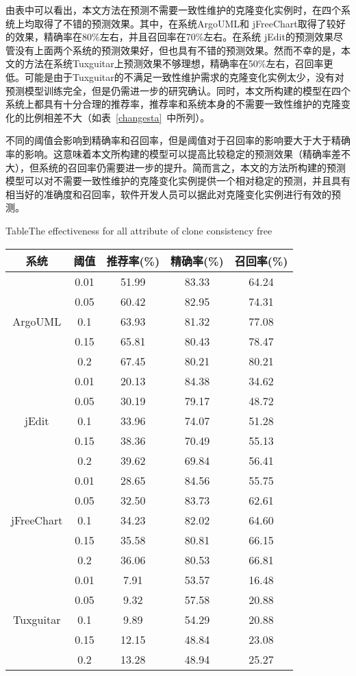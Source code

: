 由表中可以看出，本文方法在预测不需要一致性维护的克隆变化实例时，在四个系统上均取得了不错的预测效果。其中，在系统ArgoUML和 jFreeChart取得了较好的效果，精确率在80\%左右，并且召回率在70\%左右。在系统 jEdit的预测效果尽管没有上面两个系统的预测效果好，但也具有不错的预测效果。然而不幸的是，本文的方法在系统Tuxguitar上预测效果不够理想，精确率在50\%左右，召回率更低。可能是由于Tuxguitar的不满足一致性维护需求的克隆变化实例太少，没有对预测模型训练完全，但是仍需进一步的研究确认。同时，本文所构建的模型在四个系统上都具有十分合理的推荐率，推荐率和系统本身的不需要一致性维护的克隆变化的比例相差不大（如表~\ref{changesta}~中所列）。

不同的阈值会影响到精确率和召回率，但是阈值对于召回率的影响要大于大于精确率的影响。这意味着本文所构建的模型可以提高比较稳定的预测效果（精确率差不大），但系统的召回率仍需要进一步的提升。简而言之，本文的方法所构建的预测模型可以对不需要一致性维护的克隆变化实例提供一个相对稳定的预测，并且具有相当好的准确度和召回率，软件开发人员可以据此对克隆变化实例进行有效的预测。


\begin{table}[htbp]
{Table$\!$}{The effectiveness for all attribute of clone consistency free}
\vspace{0.5em}
\centering
\wuhao
\begin{tabular}{ccccc}
\toprule[1.5pt]
{系统}&{阈值}&{推荐率(\%)}&{精确率(\%)}&{召回率(\%)}\\
\midrule[1pt]
\multirow{5}{*}{ArgoUML}
&0.01&	51.99&	83.33&	64.24\\
&0.05&	60.42&	82.95&	74.31\\
&0.1&	63.93&	81.32&	77.08\\
&0.15&	65.81&	80.43&	78.47\\
&0.2&	67.45&	80.21&	80.21\\
\hline
\multirow{5}{*}{jEdit}
&0.01&	20.13&	84.38&	34.62\\
&0.05&	30.19&	79.17&	48.72\\
&0.1&	33.96&	74.07&	51.28\\
&0.15&	38.36&	70.49&	55.13\\
&0.2&	39.62&	69.84&	56.41\\
\hline
\multirow{5}{*}{jFreeChart}
&0.01&	28.65&	84.56&	55.75\\
&0.05&	32.50&	83.73&	62.61\\
&0.1&	34.23&	82.02&	64.60\\
&0.15&	35.58&	80.81&	66.15\\
&0.2&	36.06&	80.53&	66.81\\
\hline
\multirow{5}{*}{Tuxguitar}
&0.01&	7.91&	53.57&	16.48\\
&0.05&	9.32&	57.58&	20.88\\
&0.1&	9.89&	54.29&	20.88\\
&0.15&	12.15&	48.84&	23.08\\
&0.2&	13.28&	48.94&	25.27\\
\bottomrule[1.5pt]
\end{tabular}
\end{table}

